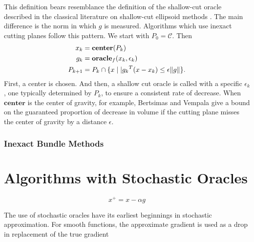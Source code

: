 This definition bears resemblance the definition of the shallow-cut
oracle described in the classical literature on shallow-cut ellipsoid
methods \cite{bland1981ellipsoid,grotschel2012geometric}. The main
difference is the norm in which $g$ is measured. Algorithms which use
inexact cutting planes follow this pattern. We start with
$P_0 = \mathcal{C}$. Then
\begin{align*} 
  x_{k} & =\mbox{\textbf{center}}(P_{k})\\
  \quad g_{k} &= \mbox{\bf oracle}_f(x_{k}, \epsilon_k) \\
  P_{k+1} & = P_k \cap \{x \mid| {g_k}^T({x -x_k}) \leq \epsilon\|g\|\}.
\end{align*}
First, a center is chosen. And then, a shallow cut oracle is called
with a specific $\epsilon_k$, one typically determined by $P_k$, to
ensure a consistent rate of decrease. When $\mathbf{center}$ is the
center of gravity, for example, Bertsimas and Vempala
\cite[Theorem~3]{bertsimas2004solving} give a bound on the guaranteed
proportion of decrease in volume if the cutting plane misses the
center of gravity by a distance $\epsilon$.


\subsubsection{Inexact Bundle Methods}

\subsubsection{}

\section{Algorithms with Stochastic Oracles}

\begin{equation}\label{eq:grad-descent}
x^+ = x - \alpha g
\end{equation}

The use of stochastic oracles have its earliest beginnings in stochastic
approximation. For smooth functions, the approximate gradient is used
as a drop in replacement of the true gradient


